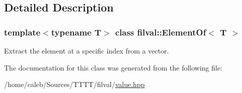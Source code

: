 \subsection{Detailed Description}
\subsubsection*{template$<$typename T$>$\newline
class filval\+::\+Element\+Of$<$ T $>$}

Extract the element at a specific index from a vector. 

The documentation for this class was generated from the following file\+:\begin{DoxyCompactItemize}
\item 
/home/caleb/\+Sources/\+T\+T\+T\+T/filval/\hyperlink{value_8hpp}{value.\+hpp}\end{DoxyCompactItemize}
